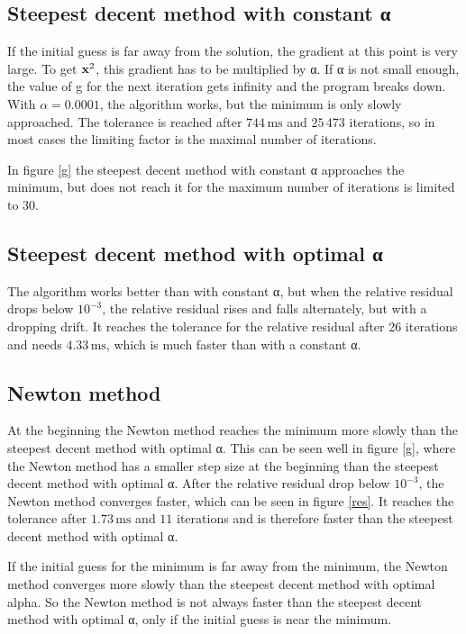 \documentclass[a4paper,11pt]{article}
\newcommand{\unit}[1]{\ensuremath{\, \mathrm{#1}}}
\begin{document}
\subsection{Steepest decent method with constant α}
If the initial guess is far away from the solution, the gradient at this point is very large.
To get ${\bf x}^{2}$, this gradient has to be multiplied by α.
If α is not small enough, the value of g for the next iteration gets infinity and the program breaks down.
With $α= 0.0001$, the algorithm works, but the minimum is only slowly approached.
The tolerance is reached after $744\unit{ms}$ and $25\,473$ iterations, so in most cases the limiting factor is the maximal number of iterations.

In figure \ref{g} the steepest decent method with constant α approaches the minimum, but does not reach it for the maximum number of iterations is limited to 30.

\subsection{Steepest decent method with optimal α}
The algorithm works better than with constant α, but when the relative residual drops below $10^{-3}$, the relative residual rises and falls alternately, but with a dropping drift.
It reaches the tolerance for the relative residual after 26 iterations and needs $4.33\unit{ms}$, which is much faster than with a constant α.

\subsection{Newton method}
At the beginning the Newton method reaches the minimum more slowly than the steepest  decent method with optimal α. 
This can be seen well in figure \ref{g}, where the Newton method has a smaller step size at the beginning than the steepest decent method with optimal α.
After the relative residual drop below $10^{-3}$, the Newton method converges faster, which can be seen in figure \ref{res}.
It reaches the tolerance after $1.73\unit{ms}$ and $11$ iterations and is therefore faster than the steepest decent method with optimal α.

If the initial guess for the minimum is far away from the minimum, the Newton method converges more slowly than the steepest decent method with optimal alpha.
So the Newton method is not always faster than the steepest decent method with optimal α, only if the initial guess is near the minimum.
\end{document}
